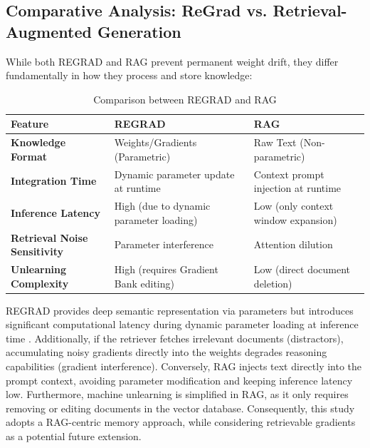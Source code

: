 \subsection{Comparative Analysis: ReGrad vs. Retrieval-Augmented Generation}
While both REGRAD and RAG prevent permanent weight drift, they differ fundamentally in how they process and store knowledge:
\begin{table}[h]
\centering
\caption{Comparison between REGRAD and RAG}
\label{tab:regrad_vs_rag}
\begin{tabular}{lll}
\hline
\textbf{Feature} & \textbf{REGRAD} & \textbf{RAG} \\ \hline
\textbf{Knowledge Format} & Weights/Gradients (Parametric) & Raw Text (Non-parametric) \\
\textbf{Integration Time} & Dynamic parameter update at runtime & Context prompt injection at runtime \\
\textbf{Inference Latency} & High (due to dynamic parameter loading) & Low (only context window expansion) \\
\textbf{Retrieval Noise Sensitivity} & Parameter interference & Attention dilution \\
\textbf{Unlearning Complexity} & High (requires Gradient Bank editing) & Low (direct document deletion) \\ \hline
\end{tabular}
\end{table}

REGRAD provides deep semantic representation via parameters but introduces significant computational latency during dynamic parameter loading at inference time \parencite{su2026retrievablegradientscontinualposttraining}. Additionally, if the retriever fetches irrelevant documents (distractors), accumulating noisy gradients directly into the weights degrades reasoning capabilities (gradient interference). Conversely, RAG injects text directly into the prompt context, avoiding parameter modification and keeping inference latency low. Furthermore, machine unlearning is simplified in RAG, as it only requires removing or editing documents in the vector database. Consequently, this study adopts a RAG-centric memory approach, while considering retrievable gradients as a potential future extension.
